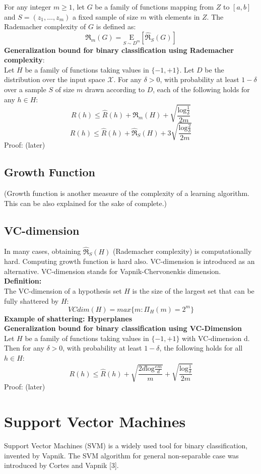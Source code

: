 \documentclass[12pt]{article}
\theoremstyle{definition}
\theoremstyle{remark}
\numberwithin{equation}{section}
\begin{document}
For any integer $m\geq 1$, let $G$ be a family of functions mapping from $Z$ to $[a,b]$ and $S=(z_1,\dots,z_m)$ a fixed sample of size $m$ with elements in $Z$. The Rademacher complexity of $G$ is defined as:
\[\mathfrak{R}_m(G)=\underset{S \sim D^m}{\text{E}}[\mathfrak{\widehat{R}}_S(G)]\]
\textbf{Generalization bound for binary classification using Rademacher complexity}:\\[0.2cm]
Let $H$ be a family of functions taking values in $\{-1,+1\}$. Let $D$ be the distribution over the input space $\mathcal{X}$. For any $\delta > 0$, with probability at least $1-\delta$ over a sample $S$ of size $m$ drawn according to $D$, each of the following holds for any $h \in H$:
\[R(h)\leq \widehat{R}(h) + \mathfrak{R}_m(H) + \sqrt{\frac{\mathrm{log}\frac{1}{\delta}}{2m}}\]
\[R(h)\leq \widehat{R}(h) + \mathfrak{\widehat{R}}_S(H) + 3\sqrt{\frac{\mathrm{log}\frac{2}{\delta}}{2m}}\]
Proof: (later)
\subsection{Growth Function}
(Growth function is another measure of the complexity of a learning algorithm. This can be also explained for the sake of complete.)
\subsection{VC-dimension}
In many cases, obtaining $\mathfrak{\widehat{R}}_S(H)$ (Rademacher complexity) is computationally hard. Computing growth function is hard also. VC-dimension is introduced as an alternative. VC-dimension stands for Vapnik-Chervonenkis dimension.\\[0.2cm]
\textbf{Definition:}\\[0.2cm]
The VC-dimension of a hypothesis set $H$ is the size of the largest set that can be fully shattered by $H$:
\[VCdim(H) = max\{m:\Pi_H(m) = 2^m\}\]
\textbf{Example of shattering: Hyperplanes}\\[0.2cm]
\textbf{Generalization bound for binary classification using VC-Dimension}\\[0.2cm]
Let $H$ be a family of functions taking values in $\{-1,+1\}$ with VC-dimension d. Then for any $\delta > 0$, with probability at least $1-\delta$, the following holds for all $h \in H$:
\[R(h) \leq \widehat{R}(h) + \sqrt{\frac{2d\mathrm{log}\frac{em}{d}}{m}} + \sqrt{\frac{\mathrm{log}\frac{1}{\delta}}{2m}}\]
Proof: (later)
\section{Support Vector Machines}
Support Vector Machines (SVM) is a widely used tool for binary classification, invented by Vapnik. The SVM algorithm for general non-separable case was introduced by Cortes and Vapnik [3].
\end{document}
